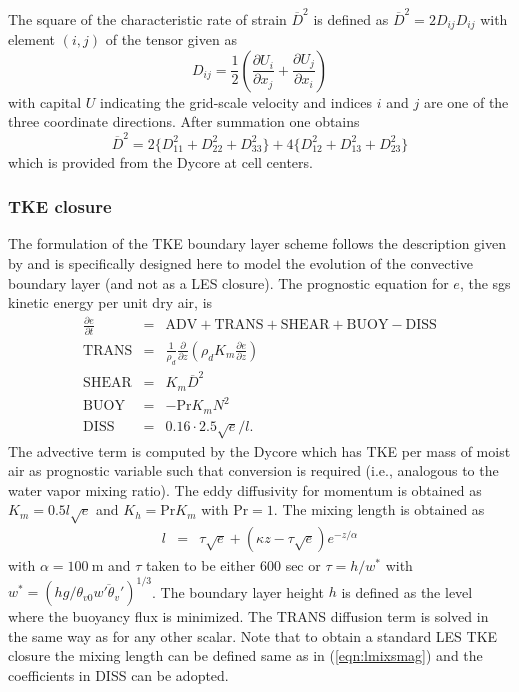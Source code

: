 \documentclass[dvipdfmx,a4paper,10pt]{article}
\begin{document}
The square of the characteristic rate of strain $\overline{D}^2$ is defined as $\overline{D}^2=2D_{ij}D_{ij}$ with element $(i,j)$ of the tensor given as
\begin{equation}
 D_{ij}=\frac{1}{2}(\frac{\partial U_i}{\partial x_j}+\frac{\partial U_j}{\partial x_i})
\end{equation}
with capital $U$ indicating the grid-scale velocity and indices $i$ and $j$ are one of the three coordinate directions. After summation one obtains 
\begin{equation}\label{eqn:def2}
 \overline{D}^2=2\{D_{11}^2+D_{22}^2+D_{33}^2\}+4\{D_{12}^2+D_{13}^2+D_{23}^2 \}
\end{equation}
which is provided from the Dycore at cell centers. 


\subsubsection{TKE closure}
The formulation of the TKE boundary layer scheme follows the description given by \cite{teixeira04} and is specifically designed here to model the evolution of the convective boundary layer (and not as a LES closure). The prognostic equation for $e$, the sgs kinetic energy per unit dry air, is
\begin{eqnarray}\label{eqn:tkebudget}
 \frac{\partial e}{\partial t}&=& \mathrm{ADV} + \mathrm{TRANS} + \mathrm{SHEAR} + \mathrm{BUOY} - \mathrm{DISS}\\
 \mathrm{TRANS} &=& \frac{1}{\rho_d}\frac{\partial}{\partial z} (\rho_d K_m  \frac{\partial e}{\partial z})\\
 \mathrm{SHEAR} &=& K_m \overline{D}^2 \\
 \mathrm{BUOY} &=& - \mathrm{Pr} K_m N^2\\
 \mathrm{DISS}&=& 0.16\cdot 2.5\sqrt{e}/l.
\end{eqnarray}
The advective term is computed by the Dycore which has TKE per mass of moist air as prognostic variable such that conversion is required (i.e., analogous to the water vapor mixing ratio). The eddy diffusivity for momentum is obtained as $K_m=0.5 l \sqrt{e}$ and $K_h=\mathrm{Pr} K_m$ with $\mathrm{Pr}=1$. The mixing length is obtained as
\begin{eqnarray}
 l &=& \tau \sqrt{e} + (\kappa z - \tau \sqrt{e}) e^{-z/\alpha}
\end{eqnarray}
with $\alpha=100\mathrm{~m}$ and $\tau$ taken to be either 600 sec or $\tau=h/w^*$ with $w^*=(hg/\theta_{v0} \overline{w'\theta_v'})^{1/3}$. The boundary layer height $h$ is defined as the level where the buoyancy flux is minimized. The TRANS diffusion term is solved in the same way as for any other scalar. Note that to obtain a standard LES TKE closure the mixing length can be defined same as in (\ref{eqn:lmixsmag}) and the coefficients in DISS can be adopted. 
\end{document}
